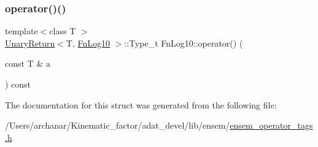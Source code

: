 \mbox{\label{structFnLog10_a1548f8a24a8e8897062608f1825e0c11}} 
\subsubsection{\texorpdfstring{operator()()}{operator()()}\hspace{0.1cm}{\footnotesize\ttfamily [2/2]}}
{\footnotesize\ttfamily template$<$class T $>$ \\
\mbox{\hyperlink{structUnaryReturn}{Unary\+Return}}$<$T, \mbox{\hyperlink{structFnLog10}{Fn\+Log10}} $>$\+::Type\+\_\+t Fn\+Log10\+::operator() (\begin{DoxyParamCaption}\item[{const T \&}]{a }\end{DoxyParamCaption}) const\hspace{0.3cm}{\ttfamily [inline]}}



The documentation for this struct was generated from the following file\+:\begin{DoxyCompactItemize}
\item 
/\+Users/archanar/\+Kinematic\+\_\+factor/adat\+\_\+devel/lib/ensem/\mbox{\hyperlink{lib_2ensem_2ensem__operator__tags_8h}{ensem\+\_\+operator\+\_\+tags.\+h}}\end{DoxyCompactItemize}
